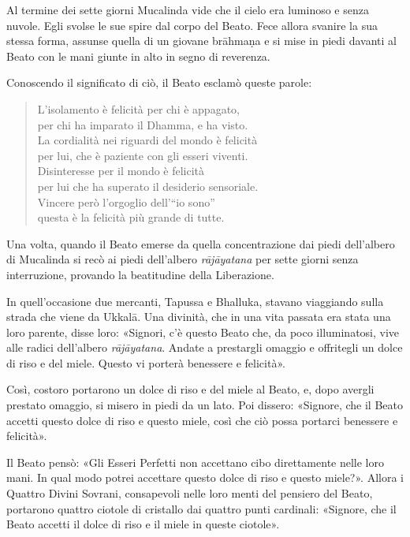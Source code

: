 Al termine dei sette giorni Mucalinda vide che il cielo era luminoso e
senza nuvole. Egli svolse le sue spire dal corpo del Beato. Fece allora
svanire la sua stessa forma, assunse quella di un giovane brāhmaṇa e si
mise in piedi davanti al Beato con le mani giunte in alto in segno di
reverenza.


Conoscendo il significato di ciò, il Beato esclamò queste parole:


\begin{quote}
L’isolamento è felicità per chi è appagato, \\
per chi ha imparato il Dhamma, e ha visto. \\
La cordialità nei riguardi del mondo è felicità \\
per lui, che è paziente con gli esseri viventi. \\
Disinteresse per il mondo è felicità \\
per lui che ha superato il desiderio sensoriale. \\
Vincere però l’orgoglio dell’“io sono” \\
questa è la felicità più grande di tutte.
\end{quote}



Una volta, quando il Beato emerse da quella concentrazione dai piedi
dell’albero di Mucalinda si recò ai piedi dell’albero \emph{rājāyatana} per
sette giorni senza interruzione, provando la beatitudine della
Liberazione.


\label{pag41}In quell’occasione due mercanti, Tapussa e Bhalluka, stavano viaggiando
sulla strada che viene da Ukkalā. Una divinità, che in una vita passata
era stata una loro parente, disse loro: «Signori, c’è questo Beato che,
da poco illuminatosi, vive alle radici dell’albero \emph{rājāyatana}. Andate
a prestargli omaggio e offritegli un dolce di riso e del miele. Questo
vi porterà benessere e felicità».


Così, costoro portarono un dolce di riso e del miele al Beato, e, dopo
avergli prestato omaggio, si misero in piedi da un lato. Poi dissero:
«Signore, che il Beato accetti questo dolce di riso e questo miele, così
che ciò possa portarci benessere e felicità».


Il Beato pensò: «Gli Esseri Perfetti non accettano cibo direttamente
nelle loro mani. In qual modo potrei accettare questo dolce di riso e
questo miele?». Allora i Quattro Divini Sovrani, consapevoli nelle loro
menti del pensiero del Beato, portarono quattro ciotole di cristallo dai
quattro punti cardinali: «Signore, che il Beato accetti il dolce di riso
e il miele in queste ciotole».


